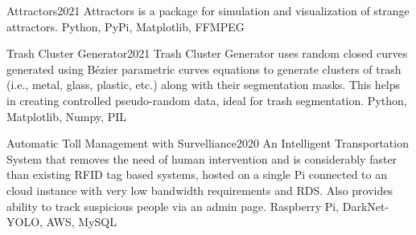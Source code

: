 %
%
%


\begin{projects}
	\project
	{Attractors}{2021}
	{
      }
	{Attractors is a package for simulation and visualization of strange attractors.}
	{Python, PyPi, Matplotlib, FFMPEG}
				
	\project
	{Trash Cluster Generator}{2021}
	{
      }
	{Trash Cluster Generator uses random closed curves generated using Bézier parametric curves equations to generate clusters of trash (i.e., metal, glass, plastic, etc.) along with their segmentation masks. This helps in creating controlled pseudo-random data, ideal for trash segmentation.}
	{Python, Matplotlib, Numpy, PIL}
	
    \project
    	{Automatic Toll Management with Survelliance}{2020}
    	{}
    	{An Intelligent Transportation System that removes the need of human intervention and is considerably faster than existing RFID tag based systems, hosted on a single Pi connected to an cloud instance with very low bandwidth requirements and RDS. Also provides ability to track suspicious people via an admin page.}
    	{Raspberry Pi, DarkNet-YOLO, AWS, MySQL}

\end{projects}